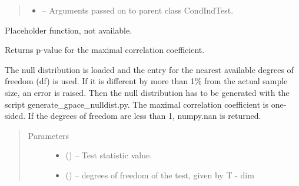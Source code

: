 \documentclass[letterpaper,10pt,english]{sphinxmanual}
\begin{document}
\begin{fulllineitems}
\begin{quote}
\begin{description}
\begin{itemize}
\item {} 
 -- Arguments passed on to parent class CondIndTest.

\end{itemize}

\end{description}\end{quote}

\begin{fulllineitems}
\label{\detokenize{index:tigramite.independence_tests.GPACE.get_analytic_confidence}}
Placeholder function, not available.

\end{fulllineitems}


\begin{fulllineitems}
\label{\detokenize{index:tigramite.independence_tests.GPACE.get_analytic_significance}}
Returns p-value for the maximal correlation coefficient.

The null distribution is loaded and the entry for the nearest available
degrees of freedom (df) is used. If it is different by more than 1\% from
the actual sample size, an error is raised. Then the null distribution
has to be generated with the script \sphinxquotedblleft{}generate\_gpace\_nulldist.py\sphinxquotedblright{}. The
maximal correlation coefficient is one-sided. If the degrees of freedom
are less than 1, numpy.nan is returned.
\begin{quote}\begin{description}
\item[{Parameters}] \leavevmode\begin{itemize}
\item {} 
 () -- Test statistic value.

\item {} 
 () -- degrees of freedom of the test, given by T - dim

\end{itemize}


\end{description}
\end{quote}
\end{fulllineitems}
\end{fulllineitems}
\end{document}
